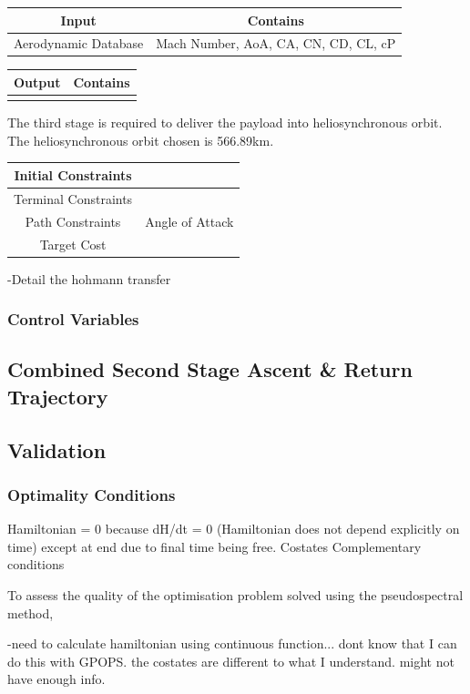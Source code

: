 \begin{tabular}{|c|c|}
	\hline Input  & Contains\\ 
	\hline Aerodynamic Database  & Mach Number, AoA, CA, CN, CD, CL, cP\\ 
	\hline 
\end{tabular} 

\begin{tabular}{|c|c|}
	\hline Output  & Contains\\ 
	\hline   & \\ 
	\hline 
\end{tabular} 

The third stage is required to deliver the payload into heliosynchronous orbit. The heliosynchronous orbit chosen is 566.89km. 

\begin{tabular}{|c|c|}
	\hline Initial Constraints  & \\ 
	\hline Terminal Constraints &  \\ 
	\hline Path Constraints & Angle of Attack \\ 
	\hline Target Cost &  \\ 
	\hline 
\end{tabular} 


-Detail the hohmann transfer

\subsubsection{Control Variables}

\subsection{Combined Second Stage Ascent \& Return  Trajectory}

\subsection{Validation}
\subsubsection{Optimality Conditions}
Hamiltonian = 0 because dH/dt = 0 (Hamiltonian does not depend explicitly on time) except at end due to final time being free.
Costates
Complementary conditions

To assess the quality of the optimisation problem solved using the pseudospectral method, 

-need to calculate hamiltonian using continuous function... dont know that I can do this with GPOPS. the costates are different to what I understand. might not have enough info. 

